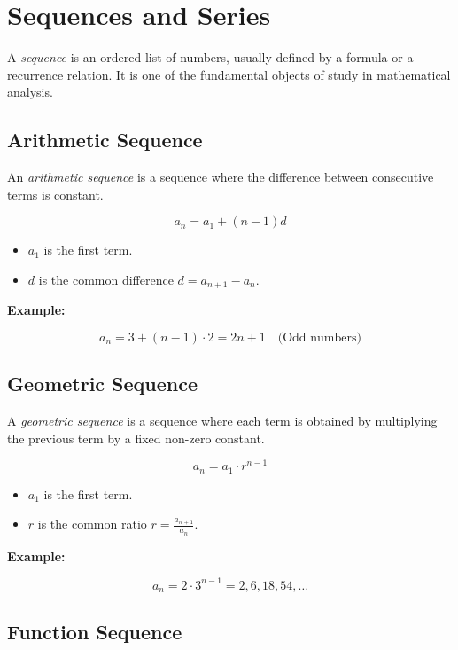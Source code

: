 \chapter{Sequences and Series}

A \emph{sequence} is an ordered list of numbers, usually defined by a formula or a recurrence relation. It is
one of the fundamental objects of study in mathematical analysis.

\section{Arithmetic Sequence}

An \emph{arithmetic sequence} is a sequence where the difference between consecutive terms is constant.

\[
	a_n = a_1 + (n - 1)d
\]

\begin{itemize}

	\item \(a_1\) is the first term.

	\item \(d\) is the common difference \(d = a_{n + 1} - a_{n}\).

\end{itemize}

\textbf{Example:}

\[
	a_n = 3 + (n - 1) \cdot 2 = 2n + 1 \quad \text{(Odd numbers)}
\]

\section{Geometric Sequence}

A \emph{geometric sequence} is a sequence where each term is obtained by multiplying the previous term
by a fixed non-zero constant.

\[
	a_n = a_1 \cdot r^{n-1}
\]

\begin{itemize}

	\item \(a_1\) is the first term.

	\item \(r\) is the common ratio \(r = \frac{a_{n + 1}}{a_n}\).

\end{itemize}

\textbf{Example:}

\[
	a_n = 2 \cdot 3^{n-1} = 2, 6, 18, 54, \dots
\]

\section{Function Sequence}

